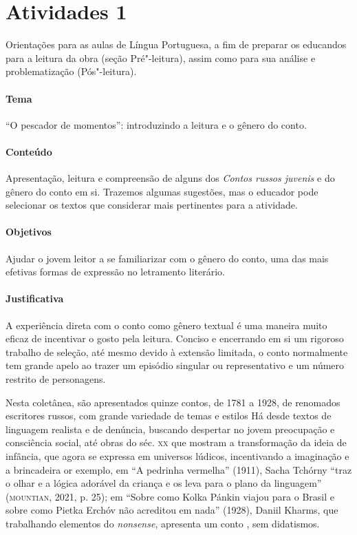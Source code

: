 \documentclass[11pt]{extarticle}
\begin{document}
\section{Atividades 1}


Orientações para as aulas de Língua Portuguesa, a fim de preparar
os educandos para a leitura da obra (seção Pré"-leitura), assim como para
sua análise e problematização (Pós"-leitura).

\paragraph{Tema} ``O pescador de momentos'': introduzindo a leitura e o gênero do conto.

\paragraph{Conteúdo}
Apresentação, leitura e compreensão de alguns dos \emph{Contos russos
juvenis} e do gênero do conto em si. Trazemos algumas sugestões, mas o
educador pode selecionar os textos que considerar mais pertinentes para
a atividade.

\paragraph{Objetivos}
Ajudar o jovem leitor a se familiarizar com o gênero do conto, uma das
mais efetivas formas de expressão no letramento literário.

\paragraph{Justificativa}
A experiência direta com o conto como gênero textual é uma maneira muito
eficaz de incentivar o gosto pela leitura. Conciso e encerrando em si um
rigoroso trabalho de seleção, até mesmo devido à extensão limitada, o
conto normalmente tem grande apelo ao trazer um episódio singular ou
representativo e um número restrito de personagens.

Nesta coletânea, são apresentados quinze contos, de 1781 a 1928, de
renomados escritores russos, com grande variedade de temas e estilos Há
desde textos de linguagem realista e de denúncia, buscando despertar no
jovem preocupação e consciência social, até obras do séc. \textsc{xx} que mostram
a transformação da ideia de infância, que agora se expressa em universos
lúdicos, incentivando a imaginação e a brincadeira or exemplo, em ``A
pedrinha vermelha'' (1911), Sacha Tchórny ``traz o olhar e a
lógica adorável da criança e os leva para o plano da linguagem''
(\textsc{mountian}, 2021, p. 25); em ``Sobre como Kolka Pánkin viajou para o
Brasil e sobre como Pietka Erchóv não acreditou em nada'' (1928), Daniil
Kharms, que trabalhando elementos do \emph{nonsense}, apresenta um conto
, sem didatismos.
\end{document}
